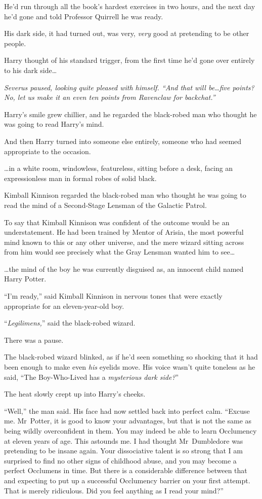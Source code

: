 He’d run through all the book’s hardest exercises in two hours, and the next
day he’d gone and told Professor Quirrell he was ready.

His dark side, it had turned out, was very, \emph{very} good at pretending to
be other people.

Harry thought of his standard trigger, from the first time he’d gone over
entirely to his dark side…

\emph{Severus paused, looking quite pleased with himself. “And that will
be…five points? No, let us make it an even ten points from Ravenclaw
for backchat.”}

Harry’s smile grew chillier, and he regarded the black-robed man who thought he
was going to read Harry’s mind.

And then Harry turned into someone else entirely, someone who had seemed
appropriate to the occasion.

…in a white room, windowless, featureless, sitting before a desk, facing
an expressionless man in formal robes of solid black.

Kimball Kinnison regarded the black-robed man who thought he was going to read
the mind of a Second-Stage Lensman of the Galactic Patrol.

To say that Kimball Kinnison was confident of the outcome would be an
understatement. He had been trained by Mentor of Arisia, the most powerful mind
known to this or any other universe, and the mere wizard sitting across from
him would see precisely what the Gray Lensman wanted him to see…

…the mind of the boy he was currently disguised as, an innocent child
named Harry Potter.

“I’m ready,” said Kimball Kinnison in nervous tones that were exactly
appropriate for an eleven-year-old boy.

“\emph{Legilimens,}” said the black-robed wizard.

There was a pause.

The black-robed wizard blinked, as if he’d seen something so shocking that it
had been enough to make even \emph{his} eyelids move. His voice wasn’t quite
toneless as he said, “The Boy-Who-Lived has a \emph{mysterious dark side?}”

The heat slowly crept up into Harry’s cheeks.

“Well,” the man said. His face had now settled back into perfect calm. “Excuse
me. Mr~Potter, it is good to know your advantages, but that is not the same as
being wildly overconfident in them. You may indeed be able to learn Occlumency
at eleven years of age. This astounds me. I had thought Mr~Dumbledore was
pretending to be insane again. Your dissociative talent is so strong that I am
surprised to find no other signs of childhood abuse, and you may become a
perfect Occlumens in time. But there is a considerable difference between that
and expecting to put up a successful Occlumency barrier on your first attempt.
That is merely ridiculous. Did you feel anything as I read your mind?”

